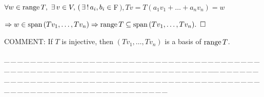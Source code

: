 \documentclass[a4paper, 11pt, UTF8]{article}
\def\range{\textup{range}\,}
\def\Spn{\textup{span}\,}
\def\Fbf{$\,{\timesbf F}\,$}
\begin{document}
\begin{large}
$\forall w\in\range T,\,\,\exists\,v\in V,\,(\,\exists\,!\,a_i,b_i\in\Fbf),Tv=T(a_1 v_1+\dots+a_n v_n)=w$\par\quad
$\Rightarrow w\in\Spn(Tv_1,\dots,Tv_n)\Rightarrow\range T\subseteq\Spn(Tv_1,\dots,Tv_n).\,\,\,\square$\par\quad
C{\small OMMENT:} If $T$ is injective, then $(Tv_1,\dots,Tv_n)$ is a basis of $\range T$.\par
{\tiny \_\,\_\,\_\,\_\,\_\,\_\,\_\,\_\,\_\,\_\,\_\,\_\,\_\,\_\,\_\,\_\,\_\,\_\,\_\,\_\,\_\,\_\,\_\,\_\,\_\,\_\,\_\,\_\,\_\,\_\,\_\,\_\,\_\,\_\,\_\,\_\,\_\,\_\,\_\,\_\,\_\,\_\,\_\,\_\,\_\,\_\,\_\,\_\,\_\,\_\,\_\,\_\,\_\,\_\,\_\,\_\,\_\,\_\,\_\,\_\,\_\,\_\,\_\,\_\,\_\,\_\,\_\,\_\,\_\,\_\,\_\_\,\_\,\_\,\_\,\_\,\_\,\_\,\_\,\_\,\_\,\_\,\_\,\_\,\_\,\_\,\_\,\_\,\_\,\_\,\_\,\_\,\_\,\_\,\_\,\_\,\_\,\_\,\_\,\_\,\_\,\_\,\_\,\_\,\_\,\_\,\_\,\_\,\_\,\_\,\_\,\_\,\_\,\_\,\_\,\_\,\_\,\_\,\_\,\_\,\_\,\_\,\_\,\_\,\_\,\_\,\_\,\_\,\_\,\_\,\_\,\_\,\_\,\_\,\_\,\_\,\_\,\_\,\_\,\_\,\_\,\_}\par


\end{large}
\end{document}
